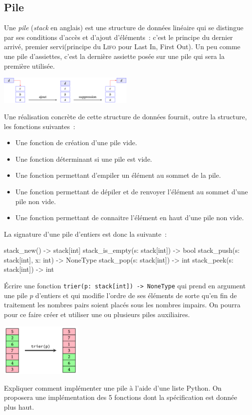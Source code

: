\documentclass{magnolia}
\begin{document}
\subsection{Pile}

Une \emph{pile} (\emph{stack} en anglais) est une structure de données linéaire qui se distingue par
ses conditions d'accès et d'ajout d'éléments~: c'est le principe du
\og dernier arrivé, premier servi\fg  (principe du \textsc{Lifo} pour Last In, First Out).
Un peu comme une pile d'assiettes, c'est la dernière assiette posée sur une pile
qui sera la première utilisée.

\begin{center}
\includegraphics[width=0.5\textwidth]{../../Commun/Images/python-cours-tableau-1.pdf}
\end{center}

Une réalisation concrète de cette structure de données fournit, outre la structure, les
fonctions suivantes~:
\begin{itemize}
\item Une fonction de création d'une pile vide.
\item Une fonction déterminant si une pile est vide.
\item Une fonction permettant d'empiler un élément au sommet de la pile.
\item Une fonction permettant de dépiler et de renvoyer l'élément au sommet d'une pile
  non vide.
\item Une fonction permettant de connaitre l'élément en haut d'une pile non vide.
\end{itemize}
La signature d'une pile d'entiers est donc la suivante~:
\begin{pythoncode}
stack_new() -> stack[int]
stack_is_empty(s: stack[int]) -> bool
stack_push(s: stack[int], x: int) -> NoneType
stack_pop(s: stack[int]) -> int
stack_peek(s: stack[int]) -> int
\end{pythoncode}

\begin{exos}
\exo Écrire une fonction \verb!trier(p: stack[int]) -> NoneType! qui prend en argument une pile $p$
  d'entiers et qui modifie l'ordre de ses éléments de sorte qu'en fin de traitement les
  nombres pairs soient placés sous les nombres impairs. On pourra pour ce faire créer et
  utiliser une ou plusieurs piles auxiliaires.
\begin{center}
\includegraphics[width=0.3\textwidth]{../../Commun/Images/python-exos-tableau-1.pdf}
\end{center}
\exo Expliquer comment implémenter une pile à l'aide d'une liste Python. On proposera une
  implémentation des 5 fonctions dont la spécification est donnée plus haut.
\end{exos}
\end{document}
